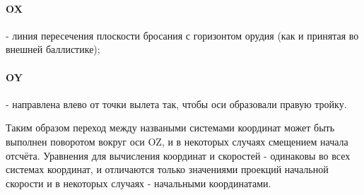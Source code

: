 \paragraph{OX} - линия пересечения плоскости бросания с горизонтом орудия (как и принятая во внешней баллистике);
\paragraph{OY} - направлена влево от точки вылета так, чтобы оси образовали правую тройку.

Таким образом переход между назваными системами координат может быть выполнен поворотом вокруг оси OZ, и в некоторых случаях смещением начала отсчёта. Уравнения для вычисления координат и скоростей - одинаковы во всех системах координат, и отличаются только значениями проекций начальной скорости и в некоторых случаях - начальными координатами.